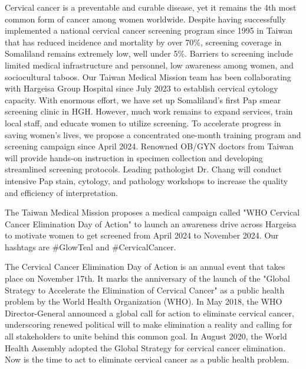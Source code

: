 \documentclass{article}
\begin{document}
Cervical cancer is a preventable and curable disease, yet it remains the 4th most common form of cancer among women worldwide. 
Despite having successfully implemented a national cervical cancer screening program since 1995 in Taiwan that has reduced incidence and mortality by over 70\%, screening coverage in Somaliland remains extremely low, well under 5\%.
Barriers to screening include limited medical infrastructure and personnel, low awareness among women, and sociocultural taboos. Our Taiwan Medical Mission team has been collaborating with Hargeisa Group Hospital since July 2023 to establish cervical cytology capacity. With enormous effort, we have set up Somaliland's first Pap smear screening clinic in HGH. However, much work remains to expand services, train local staff, and educate women to utilize screening.
To accelerate progress in saving women's lives, we propose a concentrated one-month training program and screening campaign since April 2024. Renowned OB/GYN doctors from Taiwan will provide hands-on instruction in specimen collection and developing streamlined screening protocols. Leading pathologist Dr. Chang will conduct intensive Pap stain, cytology, and pathology workshops to increase the quality and efficiency of interpretation. 


The Taiwan Medical Mission proposes a medical campaign called "WHO Cervical Cancer Elimination Day of Action" to launch an awareness drive across Hargeisa to motivate women to get screened from April 2024 to November 2024. Our hashtags are \#GlowTeal and \#CervicalCancer.

%
The Cervical Cancer Elimination Day of Action is an annual event that takes place on November 17th. It marks the anniversary of the launch of the "Global Strategy to Accelerate the Elimination of Cervical Cancer" as a public health problem by the World Health Organization (WHO).
In May 2018, the WHO Director-General announced a global call for action to eliminate cervical cancer, underscoring renewed political will to make elimination a reality and calling for all stakeholders to unite behind this common goal. In August 2020, the World Health Assembly adopted the Global Strategy for cervical cancer elimination. Now is the time to act to eliminate cervical cancer as a public health problem.


%
\end{document}
